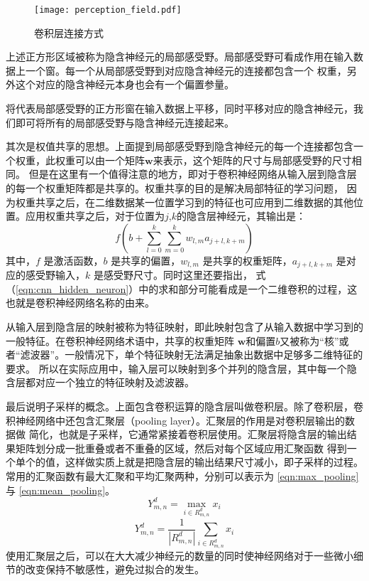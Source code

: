 \begin{figure}[htbp]
	\texttt{[image: perception\_field.pdf]}
	\caption{卷积层连接方式}
	\label{perception_filed}
\end{figure}
上述正方形区域被称为隐含神经元的局部感受野。局部感受野可看成作用在输入数据上一个窗。每一个从局部感受野到对应隐含神经元的连接都包含一个
权重，另外这个对应的隐含神经元本身也会有一个偏置参量。

将代表局部感受野的正方形窗在输入数据上平移，同时平移对应的隐含神经元，我们即可将所有的局部感受野与隐含神经元连接起来。

其次是权值共享的思想。上面提到局部感受野到隐含神经元的每一个连接都包含一个权重，此权重可以由一个矩阵$\mathbf{w}$来表示，这个矩阵的尺寸与局部感受野的尺寸相同。
但是在这里有一个值得注意的地方，即对于卷积神经网络从输入层到隐含层的每一个权重矩阵都是共享的。权重共享的目的是解决局部特征的学习问题，
因为权重共享之后，在二维数据某一位置学习到的特征也可应用到二维数据的其他位置。应用权重共享之后，对于位置为$j$,$k$的隐含层神经元，其输出是：
\begin{equation} 
\label{eqn:cnn_hidden_neuron}
f\left(b+\sum_{l=0}^{k} \sum_{m=0}^{k} w_{l, m} a_{j+l, k+m}\right)
\end{equation}
其中，$f$ 是激活函数，$b$ 是共享的偏置，$w_{l,m}$ 是共享的权重矩阵，$a_{j+l,k+m}$ 是对应的感受野输入，$k$ 是感受野尺寸。同时这里还要指出，
式（\ref{eqn:cnn_hidden_neuron}）中的求和部分可能看成是一个二维卷积的过程，这也就是卷积神经网络名称的由来。

从输入层到隐含层的映射被称为特征映射，即此映射包含了从输入数据中学习到的一般特征。在卷积神经网络术语中，共享的权重矩阵
$\mathbf{w}$和偏置$b$又被称为“核”或者“滤波器”。一般情况下，单个特征映射无法满足抽象出数据中足够多二维特征的要求。
所以在实际应用中，输入层可以映射到多个并列的隐含层，其中每一个隐含层都对应一个独立的特征映射及滤波器。

最后说明子采样的概念。上面包含卷积运算的隐含层叫做卷积层。除了卷积层，卷积神经网络中还包含汇聚层（pooling layer）。汇聚层的作用是对卷积层输出的数据做
简化，也就是子采样，它通常紧接着卷积层使用。汇聚层将隐含层的输出结果矩阵划分成一批重叠或者不重叠的区域，然后对每个区域应用汇聚函数
得到一个单个的值，这样做实质上就是把隐含层的输出结果尺寸减小，即子采样的过程。常用的汇聚函数有最大汇聚和平均汇聚两种，分别可以表示为
\ref{eqn:max_pooling} 与 \ref{eqn:mean_pooling}。
\begin{equation}
\label{eqn:max_pooling} 
Y_{m, n}^{d}=\max _{i \in R_{m, n}^{d}} x_{i}
\end{equation}
\begin{equation} 
\label{eqn:mean_pooling}
Y_{m, n}^{d}=\frac{1}{\left|R_{m, n}^{d}\right|} \sum_{i \in R_{m, n}^{d}} x_{i}
\end{equation}
使用汇聚层之后，可以在大大减少神经元的数量的同时使神经网络对于一些微小细节的改变保持不敏感性，避免过拟合的发生。

